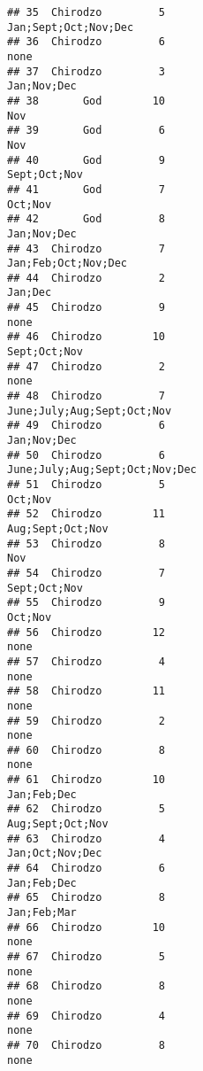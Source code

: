 \documentclass[
]{article}
\begin{document}
\begin{verbatim}
## 35  Chirodzo         5                           Jan;Sept;Oct;Nov;Dec
## 36  Chirodzo         6                                           none
## 37  Chirodzo         3                                    Jan;Nov;Dec
## 38       God        10                                            Nov
## 39       God         6                                            Nov
## 40       God         9                                   Sept;Oct;Nov
## 41       God         7                                        Oct;Nov
## 42       God         8                                    Jan;Nov;Dec
## 43  Chirodzo         7                            Jan;Feb;Oct;Nov;Dec
## 44  Chirodzo         2                                        Jan;Dec
## 45  Chirodzo         9                                           none
## 46  Chirodzo        10                                   Sept;Oct;Nov
## 47  Chirodzo         2                                           none
## 48  Chirodzo         7                     June;July;Aug;Sept;Oct;Nov
## 49  Chirodzo         6                                    Jan;Nov;Dec
## 50  Chirodzo         6                 June;July;Aug;Sept;Oct;Nov;Dec
## 51  Chirodzo         5                                        Oct;Nov
## 52  Chirodzo        11                               Aug;Sept;Oct;Nov
## 53  Chirodzo         8                                            Nov
## 54  Chirodzo         7                                   Sept;Oct;Nov
## 55  Chirodzo         9                                        Oct;Nov
## 56  Chirodzo        12                                           none
## 57  Chirodzo         4                                           none
## 58  Chirodzo        11                                           none
## 59  Chirodzo         2                                           none
## 60  Chirodzo         8                                           none
## 61  Chirodzo        10                                    Jan;Feb;Dec
## 62  Chirodzo         5                               Aug;Sept;Oct;Nov
## 63  Chirodzo         4                                Jan;Oct;Nov;Dec
## 64  Chirodzo         6                                    Jan;Feb;Dec
## 65  Chirodzo         8                                    Jan;Feb;Mar
## 66  Chirodzo        10                                           none
## 67  Chirodzo         5                                           none
## 68  Chirodzo         8                                           none
## 69  Chirodzo         4                                           none
## 70  Chirodzo         8                                           none

\end{verbatim}
\end{document}
